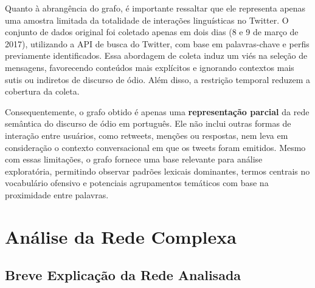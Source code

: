 \documentclass[12pt, a4paper]{article}
\begin{document}
Quanto à abrangência do grafo, é importante ressaltar que ele representa apenas uma amostra limitada da totalidade de interações linguísticas no Twitter. O conjunto de dados original foi coletado apenas em dois dias (8 e 9 de março de 2017), utilizando a API de busca do Twitter, com base em palavras-chave e perfis previamente identificados. Essa abordagem de coleta induz um viés na seleção de mensagens, favorecendo conteúdos mais explícitos e ignorando contextos mais sutis ou indiretos de discurso de ódio. Além disso, a restrição temporal reduzem a cobertura da coleta.

Consequentemente, o grafo obtido é apenas uma \textbf{representação parcial} da rede semântica do discurso de ódio em português. Ele não inclui outras formas de interação entre usuários, como retweets, menções ou respostas, nem leva em consideração o contexto conversacional em que os tweets foram emitidos. Mesmo com essas limitações, o grafo fornece uma base relevante para análise exploratória, permitindo observar padrões lexicais dominantes, termos centrais no vocabulário ofensivo e potenciais agrupamentos temáticos com base na proximidade entre palavras.

\newpage

\section{Análise da Rede Complexa}


\subsection{Breve Explicação da Rede Analisada}
\end{document}
